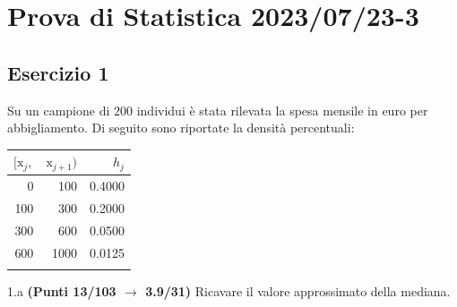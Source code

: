 \documentclass[
  11pt,
]{book}
\theoremstyle{mytheoremstyle}
\theoremstyle{mydefstyle}
\begin{document}
\section{Prova di Statistica 2023/07/23-3}\label{prova-di-statistica-20230723-3}

\subsection{Esercizio 1}\label{esercizio-1-33}

Su un campione di \(200\) individui è stata rilevata la spesa mensile in euro per abbigliamento. Di seguito sono riportate la densità percentuali:

\begin{table}[H]
\centering
\begin{tabular}{rrr}
\toprule
$[\text{x}_j,$ & $\text{x}_{j+1})$ & $h_j$\\
\midrule
0 & 100 & 0.4000\\
100 & 300 & 0.2000\\
300 & 600 & 0.0500\\
600 & 1000 & 0.0125\\
 &  & \\
\bottomrule
\end{tabular}
\end{table}

1.a \textbf{(Punti 13/103 \(\rightarrow\) 3.9/31)} Ricavare il valore approssimato della mediana.
\end{document}
